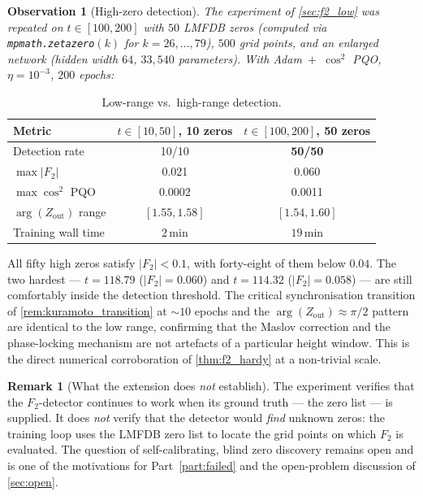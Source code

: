 \documentclass[11pt, a4paper]{article}
\theoremstyle{definition}
\newtheorem{remark}{Remark}[section]
\theoremstyle{plain}
\newtheorem{observation}[theorem]{Observation}
\begin{document}
\begin{observation}[High-zero detection]
\label{obs:high_zeros}
The experiment of \cref{sec:f2_low} was repeated on
$t\in[100,200]$ with $50$ LMFDB zeros (computed via
\texttt{mpmath.zetazero}$(k)$ for $k=26,\ldots,79$), $500$ grid
points, and an enlarged network (hidden width $64$, $33{,}540$
parameters). With Adam~$+$~$\cos^2$ PQO, $\eta=10^{-3}$, $200$
epochs:
\end{observation}

\begin{table}[h]
\centering
\caption{Low-range vs.\ high-range detection.}
\label{tab:high_zeros}
\begin{tabular}{l|c|c}
\toprule
\textbf{Metric} & $t\in[10,50]$, 10 zeros & $t\in[100,200]$, 50 zeros \\
\midrule
Detection rate              & 10/10          & \textbf{50/50} \\
$\max|F_2|$                 & 0.021          & 0.060          \\
$\max \cos^2$ PQO           & 0.0002         & 0.0011         \\
$\arg(Z_{\mathrm{out}})$ range & $[1.55,1.58]$ & $[1.54,1.60]$ \\
Training wall time          & $2$\,min       & $19$\,min      \\
\bottomrule
\end{tabular}
\end{table}

All fifty high zeros satisfy $|F_2|<0.1$, with forty-eight of them
below $0.04$. The two hardest — $t=118.79$ ($|F_2|=0.060$) and
$t=114.32$ ($|F_2|=0.058$) — are still comfortably inside the
detection threshold. The critical synchronisation transition of
\cref{rem:kuramoto_transition} at $\sim 10$ epochs and the
$\arg(Z_{\mathrm{out}})\approx\pi/2$ pattern are identical to the
low range, confirming that the Maslov correction and the
phase-locking mechanism are not artefacts of a particular height
window. This is the direct numerical corroboration of
\cref{thm:f2_hardy} at a non-trivial scale.

\begin{remark}[What the extension does \emph{not} establish]
\label{rem:high_zeros_limits}
The experiment verifies that the $F_2$-detector continues to work
when its ground truth — the zero list — is supplied. It does
\emph{not} verify that the detector would \emph{find} unknown
zeros: the training loop uses the LMFDB zero list to locate the
grid points on which $F_2$ is evaluated. The question of
self-calibrating, blind zero discovery remains open and is one of
the motivations for Part~\ref{part:failed} and the open-problem
discussion of \cref{sec:open}.
\end{remark}
\end{document}
